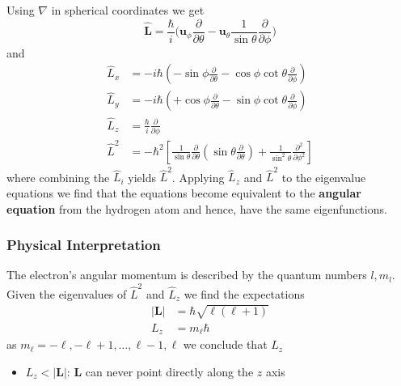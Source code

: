 Using $\nabla$ in spherical coordinates we get
\begin{equation*}
    \widehat{\mathbf{L}}=\frac{\hbar}{i}\Bigg(\mathbf{u}_{\phi}\frac{\partial}{\partial\theta}-\mathbf{u}_{\theta}\frac{1}{\sin\theta}\frac{\partial}{\partial\phi}\Bigg)
\end{equation*}
and
\begin{align*}
    \widehat{L}_{x} & =-i\hbar\left(-\sin\phi\frac{\partial}{\partial\theta}-\cos\phi\cot\theta\frac{\partial}{\partial\phi}\right)                                                                        \\
    \widehat{L}_{y} & =-i\hbar\left(+\cos\phi\frac{\partial}{\partial\theta}-\sin\phi\cot\theta\frac{\partial}{\partial\phi}\right)                                                                        \\
    \widehat{L}_{z} & =\frac{\hbar}{i}\frac{\partial}{\partial\phi}                                                                                                                                        \\
    \widehat{L}^{2} & =-\hbar^{2}\left[\frac{1}{\sin\theta}\frac{\partial}{\partial\theta}(\sin\theta\frac{\partial}{\partial\theta})+\frac{1}{\sin^{2}\theta}\frac{\partial^{2}}{\partial\phi^{2}}\right]
\end{align*}
where combining the $\widehat{L}_{i}$ yields $\widehat{L}^{2}$. Applying $\widehat{L}_{z}$ and $\widehat{L}^{2}$ to the eigenvalue equations we find that the equations become equivalent to the \textbf{angular equation} from the hydrogen atom and hence, have the same eigenfunctions.

\subsubsection{Physical Interpretation}
The electron's angular momentum is described by the quantum numbers $l,m_l$. Given the eigenvalues of $\widehat{L}^2$ and $\widehat{L}_z$ we find the expectations
\begin{align*}
    |\mathbf{L}| & =\hbar\sqrt{\ell(\ell+1)} \\
    L_{z}        & =m_{\ell}\hbar
\end{align*}
as $m_{\ell}=-\ell,-\ell+1,\dots,\ell-1,\ell$ we conclude that $L_{z}$
\begin{itemize}
    \item $L_z < |\mathbf{L}|$: $\mathbf{L}$ can never point directly along the $z$ axis
\end{itemize}

